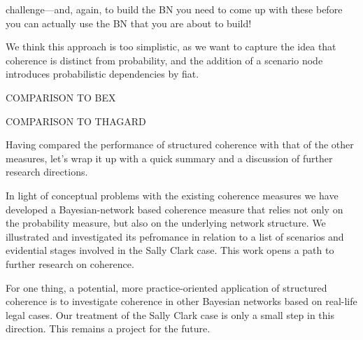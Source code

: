 \documentclass[10pt,]{scrartcl}
\begin{document}
\begin{itemize}
{challenge---and, again, to build the BN you need to come up with these before you can actually use the BN that you are about to build! 




We think this approach is too simplistic, as we want to capture the idea that coherence is distinct
from probability, and  the addition of a scenario node  introduces probabilistic
dependencies by fiat. }




\end{itemize}






















COMPARISON TO BEX

COMPARISON TO THAGARD













Having compared the performance of structured coherence with that of the other measures, let's wrap it up with a quick summary and a discussion of further research directions. 





In light of conceptual problems with the existing coherence measures we have developed a Bayesian-network based coherence measure that relies not only on the probability measure, but also on the underlying network structure.   We illustrated  and investigated its pefromance in relation to a list of scenarios and evidential stages involved in the Sally Clark case. This work  opens a path to further research on coherence.


For one thing, a potential, more practice-oriented  application of structured coherence is to investigate coherence in other Bayesian networks based on real-life legal cases. Our treatment of the Sally Clark case is only a small step in this direction. This remains a project for the future.
\end{document}
